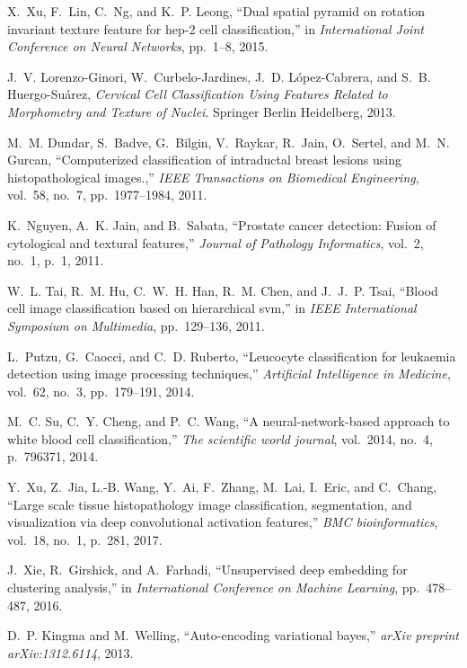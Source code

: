 \documentclass[journal]{IEEEtran}
\begin{document}
\begin{thebibliography}{10}
X.~Xu, F.~Lin, C.~Ng, and K.~P. Leong, ``Dual spatial pyramid on rotation
  invariant texture feature for hep-2 cell classification,'' in {\em
  International Joint Conference on Neural Networks}, pp.~1--8, 2015.

J.~V. Lorenzo-Ginori, W.~Curbelo-Jardines, J.~D. López-Cabrera, and S.~B.
  Huergo-Suárez, {\em Cervical Cell Classification Using Features Related to
  Morphometry and Texture of Nuclei}.
\newblock Springer Berlin Heidelberg, 2013.

M.~M. Dundar, S.~Badve, G.~Bilgin, V.~Raykar, R.~Jain, O.~Sertel, and M.~N.
  Gurcan, ``Computerized classification of intraductal breast lesions using
  histopathological images.,'' {\em IEEE Transactions on Biomedical
  Engineering}, vol.~58, no.~7, pp.~1977--1984, 2011.

K.~Nguyen, A.~K. Jain, and B.~Sabata, ``Prostate cancer detection: Fusion of
  cytological and textural features,'' {\em Journal of Pathology Informatics},
  vol.~2, no.~1, p.~1, 2011.

W.~L. Tai, R.~M. Hu, C.~W.~H. Han, R.~M. Chen, and J.~J.~P. Tsai, ``Blood cell
  image classification based on hierarchical svm,'' in {\em IEEE International
  Symposium on Multimedia}, pp.~129--136, 2011.

L.~Putzu, G.~Caocci, and C.~D. Ruberto, ``Leucocyte classification for
  leukaemia detection using image processing techniques,'' {\em Artificial
  Intelligence in Medicine}, vol.~62, no.~3, pp.~179--191, 2014.

M.~C. Su, C.~Y. Cheng, and P.~C. Wang, ``A neural-network-based approach to
  white blood cell classification,'' {\em The scientific world journal},
  vol.~2014, no.~4, p.~796371, 2014.

Y.~Xu, Z.~Jia, L.-B. Wang, Y.~Ai, F.~Zhang, M.~Lai, I.~Eric, and C.~Chang,
  ``Large scale tissue histopathology image classification, segmentation, and
  visualization via deep convolutional activation features,'' {\em BMC
  bioinformatics}, vol.~18, no.~1, p.~281, 2017.

J.~Xie, R.~Girshick, and A.~Farhadi, ``Unsupervised deep embedding for
  clustering analysis,'' in {\em International Conference on Machine Learning},
  pp.~478--487, 2016.

D.~P. Kingma and M.~Welling, ``Auto-encoding variational bayes,'' {\em arXiv
  preprint arXiv:1312.6114}, 2013.


\end{thebibliography}
\end{document}
